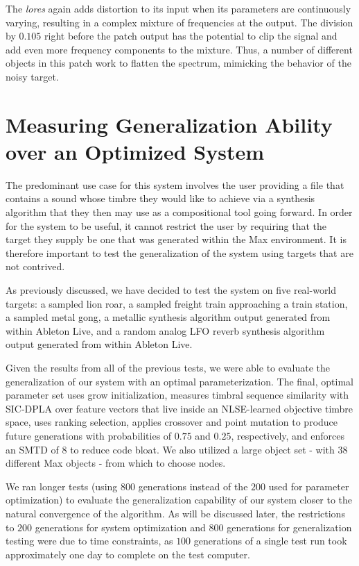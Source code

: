 \documentclass[12pt]{report} 	%
\numberwithin{figure}{chapter}
\numberwithin{table}{chapter}
\numberwithin{equation}{chapter}
\begin{document}
\begin{flushleft}
The \textit{lores\texttildelow{}} again adds distortion to its input when its parameters are continuously varying, resulting in a complex mixture of frequencies at the output. The division by $0.105$ right before the patch output has the potential to clip the signal and add even more frequency components to the mixture. Thus, a number of different objects in this patch work to flatten the spectrum, mimicking the behavior of the noisy target.

\section{Measuring Generalization Ability over an Optimized System}
The predominant use case for this system involves the user providing a file that contains a sound whose timbre they would like to achieve via a synthesis algorithm that they then may use as a compositional tool going forward. In order for the system to be useful, it cannot restrict the user by requiring that the target they supply be one that was generated within the Max environment. It is therefore important to test the generalization of the system using targets that are not contrived.

As previously discussed, we have decided to test the system on five real-world targets: a sampled lion roar, a sampled freight train approaching a train station, a sampled metal gong, a metallic synthesis algorithm output generated from within Ableton Live, and a random analog LFO reverb synthesis algorithm output generated from within Ableton Live.

Given the results from all of the previous tests, we were able to evaluate the generalization of our system with an optimal parameterization. The final, optimal parameter set uses grow initialization, measures timbral sequence similarity with SIC-DPLA over feature vectors that live inside an NLSE-learned objective timbre space, uses ranking selection, applies crossover and point mutation to produce future generations with probabilities of $0.75$ and $0.25$, respectively, and enforces an SMTD of $8$ to reduce code bloat. We also utilized a large object set - with $38$ different Max objects - from which to choose nodes.

We ran longer tests (using $800$ generations instead of the $200$ used for parameter optimization) to evaluate the generalization capability of our system closer to the natural convergence of the algorithm. As will be discussed later, the restrictions to $200$ generations for system optimization and $800$ generations for generalization testing were due to time constraints, as $100$ generations of a single test run took approximately one day to complete on the test computer. 


\end{flushleft}
\end{document}
